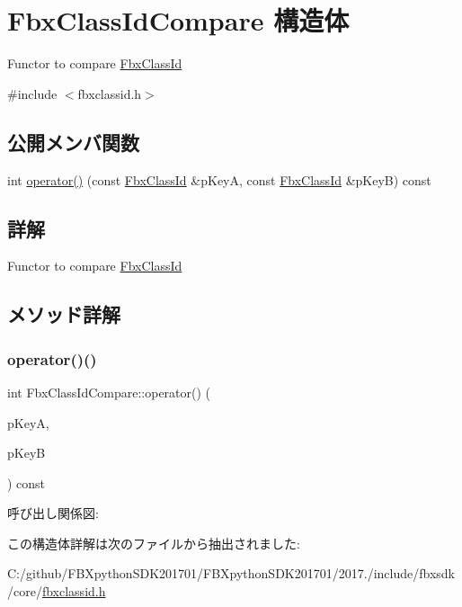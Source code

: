 \hypertarget{struct_fbx_class_id_compare}{}\section{Fbx\+Class\+Id\+Compare 構造体}
\label{struct_fbx_class_id_compare}


Functor to compare \hyperlink{class_fbx_class_id}{Fbx\+Class\+Id}  




{\ttfamily \#include $<$fbxclassid.\+h$>$}

\subsection*{公開メンバ関数}
\begin{DoxyCompactItemize}
\item 
int \hyperlink{struct_fbx_class_id_compare_a51c9a9d6cc4476af0e40eef1f710b948}{operator()} (const \hyperlink{class_fbx_class_id}{Fbx\+Class\+Id} \&p\+KeyA, const \hyperlink{class_fbx_class_id}{Fbx\+Class\+Id} \&p\+KeyB) const
\end{DoxyCompactItemize}


\subsection{詳解}
Functor to compare \hyperlink{class_fbx_class_id}{Fbx\+Class\+Id} 

\subsection{メソッド詳解}
\mbox{\label{struct_fbx_class_id_compare_a51c9a9d6cc4476af0e40eef1f710b948}} 
\subsubsection{\texorpdfstring{operator()()}{operator()()}}
{\footnotesize\ttfamily int Fbx\+Class\+Id\+Compare\+::operator() (\begin{DoxyParamCaption}\item[{const \hyperlink{class_fbx_class_id}{Fbx\+Class\+Id} \&}]{p\+KeyA,  }\item[{const \hyperlink{class_fbx_class_id}{Fbx\+Class\+Id} \&}]{p\+KeyB }\end{DoxyParamCaption}) const}

呼び出し関係図\+:


この構造体詳解は次のファイルから抽出されました\+:\begin{DoxyCompactItemize}
\item 
C\+:/github/\+F\+B\+Xpython\+S\+D\+K201701/\+F\+B\+Xpython\+S\+D\+K201701/2017./include/fbxsdk/core/\hyperlink{fbxclassid_8h}{fbxclassid.\+h}\end{DoxyCompactItemize}
